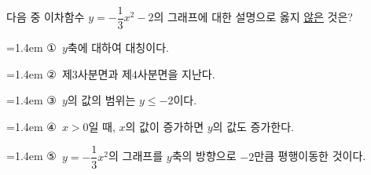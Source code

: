 다음 중 이차함수 $y=-\dfrac{1}{3}x^2-2$의 그래프에 대한 설명으로 옳지 \underline{않은} 것은?
\par\medskip\par\noindent\hangindent=1.4em {\small ①}\ $y$축에 대하여 대칭이다.\par\noindent\hangindent=1.4em {\small ②}\ 제$3$사분면과 제$4$사분면을 지난다.\par\noindent\hangindent=1.4em {\small ③}\ $y$의 값의 범위는 $y\le-2$이다.\par\noindent\hangindent=1.4em {\small ④}\ $x>0$일 때, $x$의 값이 증가하면 $y$의 값도 증가한다.\par\noindent\hangindent=1.4em {\small ⑤}\ $y=-\dfrac{1}{3}x^2$의 그래프를 $y$축의 방향으로 $-2$만큼 평행이동한 것이다.\par\medskip
